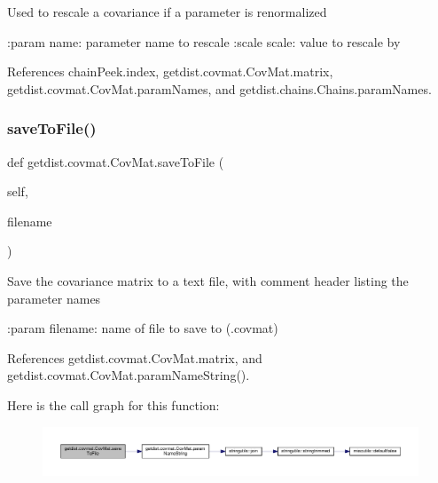 \begin{DoxyVerb}Used to rescale a covariance if a parameter is renormalized

:param name: parameter name to rescale
:scale scale: value to rescale by 
\end{DoxyVerb}
 

References chain\+Peek.\+index, getdist.\+covmat.\+Cov\+Mat.\+matrix, getdist.\+covmat.\+Cov\+Mat.\+param\+Names, and getdist.\+chains.\+Chains.\+param\+Names.

\mbox{\label{classgetdist_1_1covmat_1_1CovMat_af22c0b0f5ef4374dc5b6e20d31f4bd4b}} 
\subsubsection{\texorpdfstring{save\+To\+File()}{saveToFile()}}
{\footnotesize\ttfamily def getdist.\+covmat.\+Cov\+Mat.\+save\+To\+File (\begin{DoxyParamCaption}\item[{}]{self,  }\item[{}]{filename }\end{DoxyParamCaption})}

\begin{DoxyVerb}Save the covariance matrix to a text file, with comment header listing the parameter names

:param filename: name of file to save to (.covmat)
\end{DoxyVerb}
 

References getdist.\+covmat.\+Cov\+Mat.\+matrix, and getdist.\+covmat.\+Cov\+Mat.\+param\+Name\+String().

Here is the call graph for this function\+:
\nopagebreak
\begin{figure}[H]
\begin{center}
\leavevmode
\includegraphics[width=350pt]{classgetdist_1_1covmat_1_1CovMat_af22c0b0f5ef4374dc5b6e20d31f4bd4b_cgraph}
\end{center}
\end{figure}


